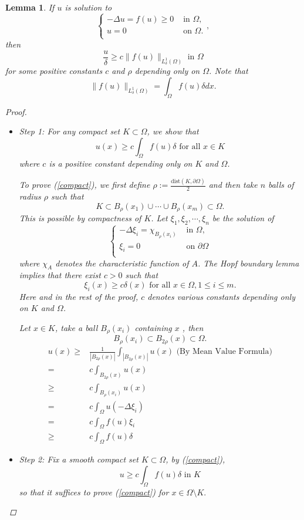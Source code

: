 \documentclass[paper=a4, fontsize=11pt]{scrartcl} %
\numberwithin{equation}{section} %
\numberwithin{figure}{section} %
\numberwithin{table}{section} %
\newtheorem{lemma}{Lemma}
\numberwithin{exercise}{section}
\begin{document}
\begin{lemma}
If $u$ is solution to 
$$\begin{cases}-\Delta u=f(u) \geq 0  &\mbox{ in } \Omega,\\
 u= 0 & \mbox{ on } \Omega.\\
 \end{cases},$$
 then 
 \begin{equation}\label{uestimate}
 \frac{u}{\delta} \geq c\|f(u)\|_{L_{\delta}^1(\Omega)}   \mbox{ in } \Omega
 \end{equation}
 for some positive constants $c$ and $\rho$ depending only on $\Omega$. Note that 
 $$\|f(u)\|_{L_{\delta}^1(\Omega)} =\int_{\Omega} f(u) \delta dx.$$
 \begin{proof}
 \begin{itemize}
 \item \emph{Step 1}: 
 For any compact set $K\subset \Omega$, we show that 
 \begin{equation}\label{compact}
 u(x)\geq c\int_{\Omega} f(u) \delta   \mbox{ for all } x\in K
 \end{equation}
 where $c$ is a positive constant depending only on $K$ and $\Omega$.
 
 To prove (\ref{compact}), we first define $\rho:=\frac{\mathrm{dist}(K,\partial \Omega)}{2}$ and then take $n$ balls of radius $\rho$ such that $$K\subset B_{\rho}(x_1)\cup\cdots\cup B_{\rho} (x_m)\subset \Omega.$$ This is possible by compactness of $K$.
Let $\xi_1, \xi_2,\cdots, \xi_n$ be the solution of 
$$\begin{cases} -\Delta \xi_i=\chi_{B_{\rho} (x_i)} & \mbox{ in }  \Omega,\\
\xi_i =0   & \mbox{ on } \partial \Omega\\
\end{cases}$$
where $\chi_A$ denotes the characteristic function of $A$. The Hopf boundary lemma implies that there exist $c>0$ such that 
$$\xi_i(x) \geq c\delta(x) \mbox{ for all } x\in \Omega, 1\leq i\leq m.$$
Here and in the rest of the proof, $c$ denotes various constants depending only on $K$ and $\Omega$. 

Let $x\in K$, take a ball $B_{\rho}(x_i)$ containing $x$ , then
$$B_{\rho}(x_i) \subset B_{2\rho }(x)\subset \Omega.$$
\begin{align*}
u(x)\geq & \frac{1}{|B_{2\rho}(x)|} \int_{|B_{2\rho} (x)|} u(x) \mbox{ (By Mean Value Formula)}\\
{}=&c \int_{B_{2\rho} (x)} u(x)\\
{}\geq & c \int_{B_{\rho} (x_i)}u(x)\\
{}=&c\int_{\Omega} u(-\Delta \xi_i) \\
{}=&c\int_{\Omega} f(u) \xi_i\\
{}\geq& c\int_{\Omega} f(u) \delta 
\end{align*}
\item \emph{Step 2:}
Fix a smooth compact set $K\subset \Omega$, by (\ref{compact}), 
$$u\geq c\int_{\Omega} f(u) \delta \mbox { in } K$$
so that it suffices to prove (\ref{compact}) for $x\in\Omega\setminus K.$


\end{itemize}
\end{proof}
\end{lemma}
\end{document}
